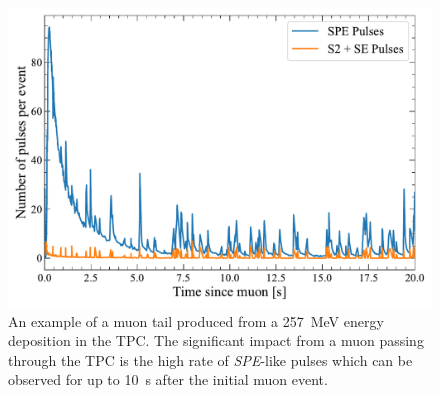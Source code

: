 \begin{figure}[ht!]
    \centering
    \includegraphics[width=0.8\linewidth]{figures/Muons/PulsesOverTime.pdf}
    \caption{An example of a muon tail produced from a 257~MeV energy deposition in the TPC. The significant impact from a muon passing through the TPC is the high rate of \textit{SPE}-like pulses which can be observed for up to 10~s after the initial muon event.}
    \label{fig:MuonTailExample}
\end{figure}

